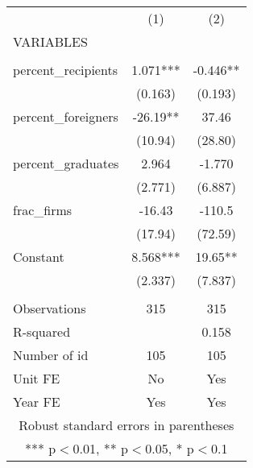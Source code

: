 \documentclass[]{article}
\begin{document}
\begin{tabular}{lcc} \hline
 & (1) & (2) \\
VARIABLES &  &  \\ \hline
 &  &  \\
percent\_recipients & 1.071*** & -0.446** \\
 & (0.163) & (0.193) \\
percent\_foreigners & -26.19** & 37.46 \\
 & (10.94) & (28.80) \\
percent\_graduates & 2.964 & -1.770 \\
 & (2.771) & (6.887) \\
frac\_firms & -16.43 & -110.5 \\
 & (17.94) & (72.59) \\
Constant & 8.568*** & 19.65** \\
 & (2.337) & (7.837) \\
 &  &  \\
Observations & 315 & 315 \\
R-squared &  & 0.158 \\
Number of id & 105 & 105 \\
Unit FE & No & Yes \\
 Year FE & Yes & Yes \\ \hline
\multicolumn{3}{c}{ Robust standard errors in parentheses} \\
\multicolumn{3}{c}{ *** p$<$0.01, ** p$<$0.05, * p$<$0.1} \\
\end{tabular}
\end{document}
